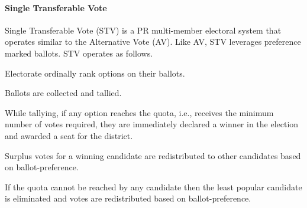 %
%

\paragraph{Single Transferable Vote}
Single Transferable Vote (STV) is a PR multi-member electoral system that
operates similar to the Alternative Vote (AV). Like AV, STV leverages preference
marked ballots. STV operates as follows.
\begin{itemize*}[label={}, itemjoin={}]
  \item Electorate ordinally rank options on their ballots.
  \item Ballots are collected and tallied.
  \item While tallying, if any option reaches the quota, i.e., receives the
    minimum number of votes required, they are immediately declared a winner in
    the election and awarded a seat for the district.
  \item Surplus votes for a winning candidate are redistributed to other
    candidates based on ballot-preference.
  \item If the quota cannot be reached by any candidate then the least popular
    candidate is eliminated and votes are redistributed based on
    ballot-preference.
\end{itemize*}\cite{stv}

